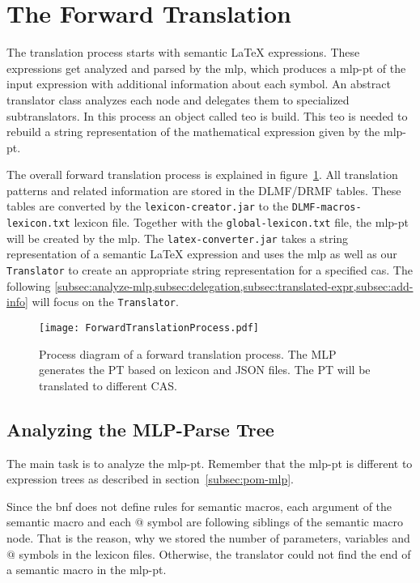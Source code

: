 \section{The Forward Translation}\label{sec:forward-translation}
The translation process starts with semantic \LaTeX{} expressions. These expressions get analyzed and parsed by the \gls{mlp}, which produces a \gls{mlp-pt} of the input expression with additional information about each symbol. An abstract translator class analyzes each node and delegates them to specialized subtranslators. In this process an object called \gls{teo} is build. This \gls{teo} is needed to rebuild a string representation of the mathematical expression given by the \gls{mlp-pt}.

The overall forward translation process is explained in figure~\ref{fig:forward-trans}. All translation patterns and related information are stored in the DLMF/DRMF tables. These tables are converted by the \verb|lexicon-creator.jar| to the \verb|DLMF-macros-lexicon.txt| lexicon file. Together with the \verb|global-lexicon.txt| file, the \gls{mlp-pt} will be created by the \gls{mlp}. The \verb|latex-converter.jar| takes a string representation of a semantic \LaTeX{} expression and uses the \gls{mlp} as well as our \verb|Translator| to create an appropriate string representation for a specified \gls{cas}. The following \cref{subsec:analyze-mlp,subsec:delegation,subsec:translated-expr,subsec:add-info} will focus on the \verb|Translator|.

\begin{figure}[ht]
	\vspace{-10pt}
	\centering
	\texttt{[image: ForwardTranslationProcess.pdf]}
	\caption{Process diagram of a forward translation process. The MLP generates the PT based on lexicon and JSON files. The PT will be translated to different CAS.}
	\label{fig:forward-trans}
	\vspace{-10pt}
\end{figure}

\subsection{Analyzing the MLP-Parse Tree}\label{subsec:analyze-mlp}
The main task is to analyze the \gls{mlp-pt}. Remember that the \gls{mlp-pt} is different to expression trees as described in section~\ref{subsec:pom-mlp}.

Since the \gls{bnf} does not define rules for semantic macros, each argument of the semantic macro and each $@$ symbol are following siblings of the semantic macro node. That is the reason, why we stored the number of parameters, variables and $@$ symbols in the lexicon files. Otherwise, the translator could not find the end of a semantic macro in the \gls{mlp-pt}.

